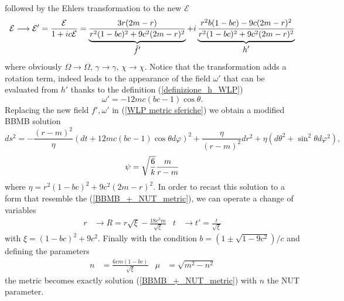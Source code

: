 followed by the Ehlers transformation to the new $\mathcal{E}$
\begin{equation}
    \mathcal{E} \longrightarrow \mathcal{E}' = \frac{\mathcal{E}}{1+ic\mathcal{E}} = \underbrace{\frac{3r(2m-r)}{r^2(1-bc)^2+9c^2(2m-r)^2}}_{\displaystyle\Tilde{f}'} + i \underbrace{\frac{r^2b(1-bc)-9c(2m-r)^2}{r^2(1-bc)^2+9c^2(2m-r)^2}}_{\displaystyle h'}
\end{equation}
where obviously $\Omega\rightarrow\Omega$, $\gamma\rightarrow\gamma$, $\chi\rightarrow\chi$. Notice that the transformation adds a rotation term, indeed leads to the appearance of the field $\omega'$ that can be evaluated from $h'$ thanks to the definition (\ref{definizione_h_WLP})
\begin{equation}
    \omega' = -12 mc(bc-1) \cos\theta.
\end{equation}
Replacing the new field $f',\omega'$ in (\ref{WLP metric sferiche}) we obtain a modified BBMB solution 
\begin{equation}
    ds^2 = -\frac{(r-m)^2}{\eta}(dt+12mc(bc-1)\cos\theta d\varphi)^2 + \frac{\eta}{(r-m)^2}dr^2+ \eta(d\theta^2 + \sin^2\theta d\varphi^2),
\end{equation}
\begin{equation}
    \psi = \sqrt{\frac{6}{k}}\frac{m}{r-m} \notag
\end{equation}
where $\eta = r^2(1-bc)^2 +9c^2(2m-r)^2$. In order to recast this solution to a form that resemble the (\ref{BBMB_+_NUT_metric}), we can operate a change of variables 
\begin{align}
  r &\longrightarrow R = r\sqrt{\xi} - \frac{18c^2m}{\sqrt{\xi}} & t &\longrightarrow t' = \frac{t}{\sqrt{\xi}}
\end{align}
with $\xi = (1-bc)^2+9c^2$. Finally with the condition $b=(1\pm \sqrt{1-9c^2})/c$ and defining the parameters 
\begin{align}
  n &= \frac{6cm(1-bc)}{\sqrt{\xi}} & \mu &= \sqrt{m^2-n^2}
\end{align}
the metric becomes exactly solution (\ref{BBMB_+_NUT_metric}) with $n$ the NUT parameter.

